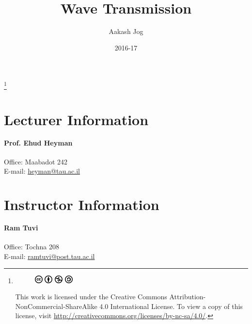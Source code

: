 \documentclass[titlepage, fleqn, a4paper, 12pt, twoside]{article}
\title{Wave Transmission}
\author{Aakash Jog}
\date{2016-17}
\theoremstyle{definition}
\theoremstyle{theorem}
\newcommand\blfootnote[1]{%
	\begingroup
	\renewcommand\thefootnote{}\footnote{#1}%
	\addtocounter{footnote}{-1}%
	\endgroup
}
\begin{document}
\begin{titlepage}
\maketitle
\end{titlepage}
\restoregeometry

\blfootnote
{
	\begin{figure}[H]
		\includegraphics[height = 12pt]{cc.pdf}
		\includegraphics[height = 12pt]{by.pdf}
		\includegraphics[height = 12pt]{nc.pdf}
		\includegraphics[height = 12pt]{sa.pdf}
	\end{figure}
	This work is licensed under the Creative Commons Attribution-NonCommercial-ShareAlike 4.0 International License. To view a copy of this license, visit \url{http://creativecommons.org/licenses/by-nc-sa/4.0/}.
} %

\tableofcontents

\clearpage
\section{Lecturer Information}

\textbf{Prof. Ehud Heyman}\\
~\\
Office: Maabadot 242\\
E-mail: \href{mailto:heyman@tau.ac.il}{heyman@tau.ac.il}\\

\section{Instructor Information}

\textbf{Ram Tuvi}\\
~\\
Office: Tochna 208\\
E-mail: \href{mailto:ramtuvi@post.tau.ac.il}{ramtuvi@post.tau.ac.il}\\
\end{document}
